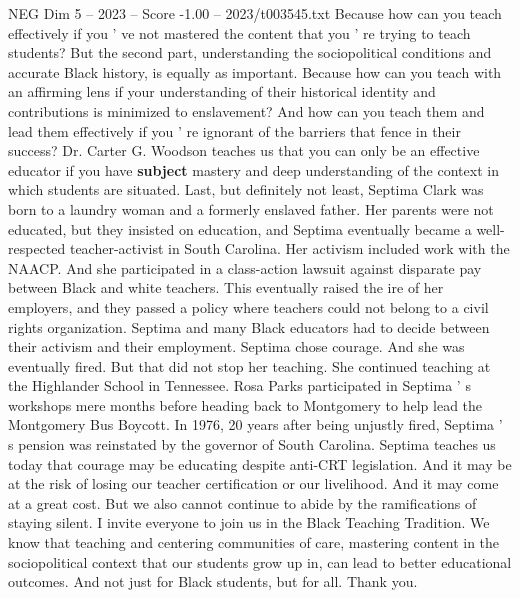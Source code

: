 \begin{textsample}{NEG Dim 5 – 2023 – Score -1.00 – 2023/t003545.txt}
Because how can you teach effectively if you ' ve not mastered the content that you ' re trying to teach students?
But the second part, understanding the sociopolitical conditions and accurate Black history, is equally as important.
Because how can you teach with an affirming lens if your understanding of their historical identity and contributions is minimized to enslavement?
And how can you teach them and lead them effectively if you ' re ignorant of the barriers that fence in their success?
Dr.
Carter G.
Woodson teaches us that you can only be an effective educator if you have \textbf{subject} mastery and deep understanding of the context in which students are situated.
Last, but definitely not least, Septima Clark was born to a laundry woman and a formerly enslaved father.
Her parents were not educated, but they insisted on education, and Septima eventually became a well-respected teacher-activist in South Carolina.
Her activism included work with the NAACP.
And she participated in a class-action lawsuit against disparate pay between Black and white teachers.
This eventually raised the ire of her employers, and they passed a policy where teachers could not belong to a civil rights organization.
Septima and many Black educators had to decide between their activism and their employment.
Septima chose courage.
And she was eventually fired.
But that did not stop her teaching.
She continued teaching at the Highlander School in Tennessee.
Rosa Parks participated in Septima ' s workshops mere months before heading back to Montgomery to help lead the Montgomery Bus Boycott.
In 1976, 20 years after being unjustly fired, Septima ' s pension was reinstated by the governor of South Carolina.
Septima teaches us today that courage may be educating despite anti-CRT legislation.
And it may be at the risk of losing our teacher certification or our livelihood.
And it may come at a great cost.
But we also cannot continue to abide by the ramifications of staying silent.
I invite everyone to join us in the Black Teaching Tradition.
We know that teaching and centering communities of care, mastering content in the sociopolitical context that our students grow up in, can lead to better educational outcomes.
And not just for Black students, but for all.
Thank you.

\end{textsample}
